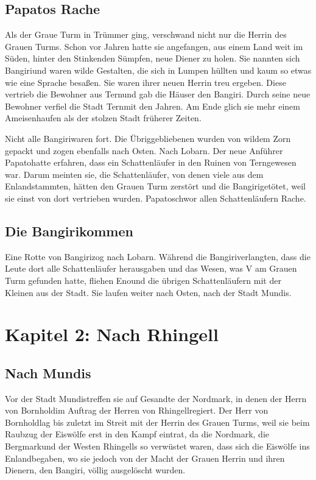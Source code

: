 \documentclass[12pt,a4paper,onecolumn,twoside,ngerman]{book}
\newcommand{\Tern}{Tern}
\newcommand{\Bangiri}{Bangiri}
\newcommand{\Papato}{Papato}
\newcommand{\Enland}{Enland}
\newcommand{\Eno}{Eno}
\newcommand{\Lobarn}{Lobarn}
\newcommand{\Nordmark}{Nordmark}
\newcommand{\Bergmark}{Bergmark}
\newcommand{\Bornhold}{Bornhold}
\newcommand{\Rhingell}{Rhingell}
\newcommand{\Mundis}{Mundis}
\begin{document}
\section{Papatos Rache}

Als der Graue Turm in Trümmer ging, verschwand nicht nur die Herrin des Grauen Turms. Schon vor Jahren hatte sie angefangen, aus einem Land weit im Süden, hinter den Stinkenden Sümpfen, neue Diener zu holen. Sie nannten sich \Bangiri und waren wilde Gestalten, die sich in Lumpen hüllten und kaum so etwas wie eine Sprache besaßen. 
Sie waren ihrer neuen Herrin treu ergeben. Diese vertrieb die Bewohner aus \Tern und gab die Häuser den \Bangiri. Durch seine neue Bewohner verfiel die Stadt \Tern mit den Jahren. Am Ende glich sie mehr einem Ameisenhaufen als der stolzen Stadt früherer Zeiten.

Nicht alle \Bangiri waren fort. Die Übriggebliebenen wurden von wildem Zorn gepackt und zogen ebenfalls nach Osten. Nach \Lobarn. Der neue Anführer \Papato hatte erfahren, dass ein Schattenläufer in den Ruinen von \Tern gewesen war. Darum meinten sie, die Schattenläufer, von denen viele aus dem \Enland stammten, hätten den Grauen Turm zerstört und die \Bangiri getötet, weil sie einst von dort vertrieben wurden. \Papato schwor allen Schattenläufern Rache.

\section{Die \Bangiri kommen}
Eine Rotte von \Bangiri zog nach \Lobarn.
Während die \Bangiri verlangten, dass die Leute dort alle Schattenläufer herausgaben und das Wesen, was V am Grauen Turm gefunden hatte, fliehen \Eno und die übrigen Schattenläufern mit der Kleinen aus der Stadt. Sie laufen weiter nach Osten, nach der Stadt \Mundis.

\chapter{Kapitel 2: Nach \Rhingell}

\section{Nach \Mundis}
Vor der Stadt \Mundis treffen sie auf Gesandte der \Nordmark, in denen der Herrn von \Bornhold im Auftrag der Herren von \Rhingell regiert.
Der Herr von \Bornhold lag bis zuletzt im Streit mit der Herrin des Grauen Turms, weil sie beim Raubzug der Eiswölfe erst in den Kampf  eintrat, da die \Nordmark, die \Bergmark und der Westen \Rhingell{s} so verwüstet waren, dass sich die Eiswölfe ins \Enland begaben, wo sie jedoch von der Macht der Grauen Herrin und ihren Dienern, den \Bangiri, völlig ausgelöscht wurden. 
\end{document}
